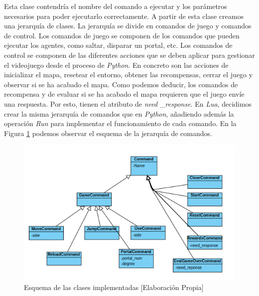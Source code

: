 Esta clase contendría el nombre del comando a ejecutar y los parámetros necesarios para poder ejecutarlo correctamente. A partir de esta clase creamos una jerarquía de clases. La jerarquía se divide en comandos de juego y comandos de control. Los comandos de juego se componen de los comandos que pueden ejecutar los agentes, como saltar, disparar un portal, etc. Los comandos de control se componen de las diferentes acciones que se deben aplicar para gestionar el videojuego desde el proceso de \textit{Python}. En concreto son las acciones de inicializar el mapa, resetear el entorno, obtener las recompensas, cerrar el juego y observar si se ha acabado el mapa. Como podemos deducir, los comandos de recompensa y de evaluar si se ha acabado el mapa requieren que el juego envíe una respuesta. Por esto, tienen el atributo de \textit{need \_response}. En \textit{Lua}, decidimos crear la misma jerarquía de comandos que en \textit{Python}, añadiendo además la operación \textit{Run} para implementar el funcionamiento de cada comando. En la Figura \ref {fig:clases} podemos observar el esquema de la jerarquía de comandos.
\begin{figure}[ht]
    \centering
    \includegraphics[width=1.0\textwidth]{img/clases.png}
    \caption{Esquema de las clases implementadas [Elaboración Propia]}
    \label{fig:clases}
\end{figure}

